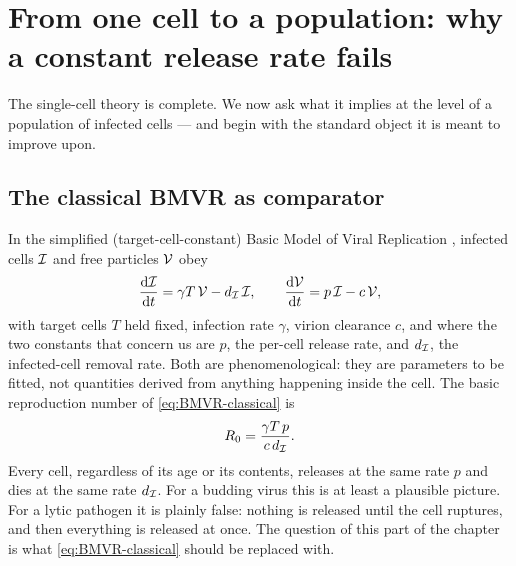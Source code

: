 
\section{From one cell to a population: why a constant release rate fails}
\label{sec:why-constant-fails}

The single-cell theory is complete. We now ask what it implies at the level
of a population of infected cells --- and begin with the standard object it
is meant to improve upon.

\subsection{The classical BMVR as comparator}
\label{sec:bmvr-classical}

In the simplified (target-cell-constant) Basic Model of Viral Replication
\cite{mclean1993balance,nowak1996population,perelson1996hiv}, infected
cells $\mathcal{I}$ and free particles $\mathcal{V}$ obey
\begin{equation}
\displaystyle\frac{{\rm d} \mathcal{I}}{{\rm d} t} = \gamma T\,\mathcal{V} - d_{\mathcal{I}}\,\mathcal{I},
\qquad
\displaystyle\frac{{\rm d} \mathcal{V}}{{\rm d} t} = p\,\mathcal{I} - c\,\mathcal{V},
\label{eq:BMVR-classical}
\end{equation}
with target cells $T$ held fixed, infection rate $\gamma$, virion clearance
$c$, and where the two constants that concern us are $p$, the per-cell
release rate, and $d_{\mathcal{I}}$, the infected-cell removal rate. Both are
phenomenological: they are parameters to be fitted, not quantities derived
from anything happening inside the cell. The basic reproduction number of
\eqref{eq:BMVR-classical} is
\begin{equation}
R_0=\frac{\gamma T\,p}{c\,d_{\mathcal{I}}}.
\end{equation}
Every cell, regardless of its age or its contents, releases at the same rate
$p$ and dies at the same rate $d_{\mathcal{I}}$. For a budding virus this is at
least a plausible picture. For a lytic pathogen it is plainly false: nothing
is released until the cell ruptures, and then everything is released at
once. The question of this part of the chapter is what
\eqref{eq:BMVR-classical} should be replaced with.

